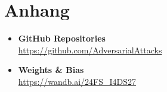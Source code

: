 \section{Anhang}



\begin{itemize}
    \item \textbf{GitHub Repositories} \\
    \href{https://github.com/AdversarialAttacks}{https://github.com/AdversarialAttacks}
    \item \textbf{Weights \& Bias} \\
    \href{https://wandb.ai/24FS_I4DS27}
    {https://wandb.ai/24FS\_I4DS27}
\end{itemize}